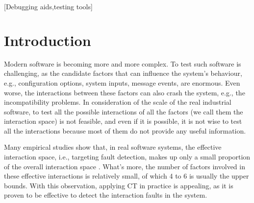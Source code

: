 \documentclass{sig-alternate}
\begin{document}
[Debugging aids,testing tools]



\section{Introduction}

 Modern software is becoming more and more complex. To test such software is challenging, as the candidate factors that can influence the system's behaviour, e.g., configuration options, system inputs, message events, are enormous. Even worse, the interactions between these factors can also crash the system, e.g., the incompatibility problems. In consideration of the scale of the real industrial software, to test all the possible interactions of all the factors (we call them the interaction space) is not feasible, and even if it is possible, it is not wise to test all the interactions because most of them do not provide any useful information.

Many empirical studies show that, in real software systems, the effective interaction space, i.e., targeting fault detection, makes up only a small proportion of the overall interaction space \cite{kuhn2002investigation,kuhn2004software}. What's more, the number of factors involved in these effective interactions is relatively small, of which 4 to 6 is usually the upper bounds\cite{kuhn2002investigation}. With this observation, applying CT in practice is appealing, as it is proven to be effective to detect the interaction faults in the system.
\end{document}
